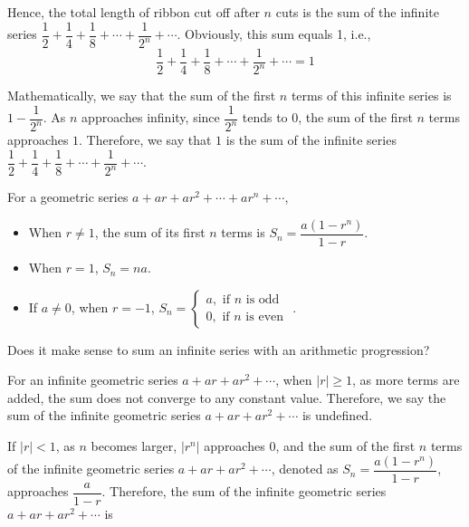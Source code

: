 \documentclass{report}
\begin{document}
        Hence, the total length of ribbon cut off after $n$ cuts is the sum of the infinite series $\dfrac{1}{2}+\dfrac{1}{4}+\dfrac{1}{8}+\cdots+\dfrac{1}{2^n}+\cdots$. Obviously, this sum equals 1, i.e.,
        $$
        \dfrac{1}{2}+\dfrac{1}{4}+\dfrac{1}{8}+\cdots+\dfrac{1}{2^n}+\cdots=1
        $$

        \vspace{-1em}
        Mathematically, we say that the sum of the first $n$ terms of this infinite series is $1-\dfrac{1}{2^n}$. As $n$ approaches infinity, since $\dfrac{1}{2^n}$ tends to $0$, the sum of the first $n$ terms approaches $1$. Therefore, we say that $1$ is the sum of the infinite series $\dfrac{1}{2}+\dfrac{1}{4}+\dfrac{1}{8}+\cdots+\dfrac{1}{2^n}+\cdots$.

        For a geometric series $a+ar+ar^2+\cdots+ar^n+\cdots$,
        \begin{itemize}
            \item When $r \neq 1$, the sum of its first $n$ terms is $S_{n}=\dfrac{a(1-r^n)}{1-r}$.

            \item When $r=1$, $S_{n}=na$.
            
            \item If $a \neq 0$, when $r=-1$, $S_{n}=\left\{\begin{array}{l}a, \text { if } n \text { is odd } \\ 0, \text { if } n \text { is even }\end{array}\right.$.
        \end{itemize}
        
        \begin{think}
            
            \noindent Does it make sense to sum an infinite series with an arithmetic progression?
        \end{think}

        For an infinite geometric series $a+ar+ar^2+\cdots$, when $|r| \geq 1$, as more terms are added, the sum does not converge to any constant value. Therefore, we say the sum of the infinite geometric series $a+ar+ar^2+\cdots$ is undefined.

        If $|r|<1$, as $n$ becomes larger, $\left|r^{n}\right|$ approaches $0$, and the sum of the first $n$ terms of the infinite geometric series $a+ar+ar^2+\cdots$, denoted as $S_{n}=\dfrac{a\left(1-r^{n}\right)}{1-r}$, approaches $\dfrac{a}{1-r}$. Therefore, the sum of the infinite geometric series $a+ar+ar^2+\cdots$ is
        
\end{document}

